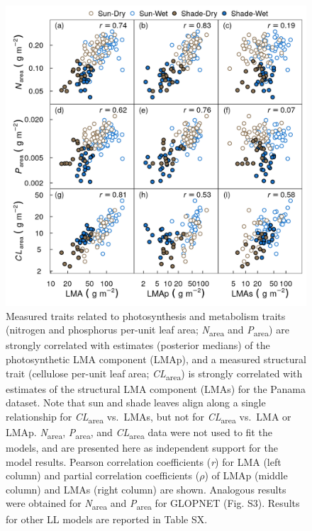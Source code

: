 \documentclass[
  12pt,
  a4paper,
,tablecaptionabove
]{scrartcl}
\begin{document}
\begin{figure}
\hypertarget{fig:PA-NPC}{%
\centering
\includegraphics{../figs/pa_point_npc.png}
\caption{Measured traits related to photosynthesis and metabolism traits (nitrogen and phosphorus per-unit leaf area; \emph{N}\textsubscript{area} and \emph{P}\textsubscript{area}) are strongly correlated with estimates (posterior medians) of the photosynthetic LMA component (LMAp), and a measured structural trait (cellulose per-unit leaf area; \emph{CL}\textsubscript{area}) is strongly correlated with estimates of the structural LMA component (LMAs) for the Panama dataset.
Note that sun and shade leaves align along a single relationship for \emph{CL}\textsubscript{area} vs.~LMAs, but not for \emph{CL}\textsubscript{area} vs.~LMA or LMAp. \emph{N}\textsubscript{area}, \emph{P}\textsubscript{area}, and \emph{CL}\textsubscript{area} data were not used to fit the models, and are presented here as independent support for the model results.
Pearson correlation coefficients (\emph{r}) for LMA (left column) and partial correlation coefficients (\(\rho\)) of LMAp (middle column) and LMAs (right column) are shown.
Analogous results were obtained for \emph{N}\textsubscript{area} and \emph{P}\textsubscript{area} for GLOPNET (Fig. S3).
Results for other LL models are reported in Table SX.}\label{fig:PA-NPC}
}
\end{figure}
\end{document}
